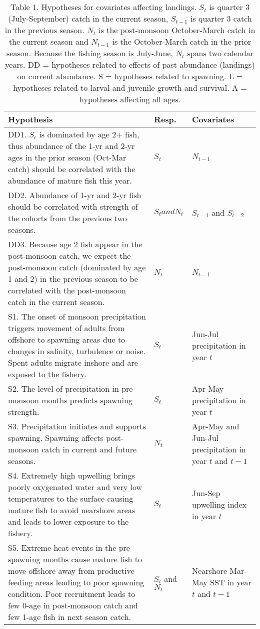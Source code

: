
\begin{table}[t]

\caption{\label{tab:print-table-hyp}Table 1. Hypotheses for covariates affecting landings.  $S_t$ is quarter 3 (July-September) catch in the current season, $S_{t-1}$ is quarter 3 catch in the previous season. $N_t$ is the post-monsoon October-March catch in the current season and $N_{t-1}$ is the October-March catch in the prior season. Because the fishing season is July-June, $N_t$ spans two calendar years. DD = hypotheses related to effects of past abundance (landings) on current abundance. S = hypotheses related to spawning. L = hypotheses related to larval and juvenile growth and survival. A = hypotheses affecting all ages.}
\centering
\begin{tabular}{>{\raggedright\arraybackslash}p{10.5cm}|>{\raggedright\arraybackslash}p{1cm}|>{\raggedright\arraybackslash}p{3cm}}
\hline
Hypothesis & Resp. & Covariates\\
\hline
DD1.  $S_t$ is dominated by age 2+ fish, thus abundance of the 1-yr and 2-yr ages in the prior season (Oct-Mar catch) should be correlated with the abundance of mature fish this year. & $S_t$ & $N_{t-1}$\\
\hline
DD2.  Abundance of 1-yr and 2-yr fish should be correlated with strength of the cohorts from the previous two seasons. & $S_t and N_t$ & $S_{t-1}$ and $S_{t-2}$\\
\hline
DD3.  Because age 2 fish appear in the post-monsoon catch, we expect the post-monsoon catch (dominated by age 1 and 2) in the previous season to be correlated with the post-monsoon catch in the current season. & $N_t$ & $N_{t-1}$\\
\hline
S1.  The onset of monsoon precipitation triggers movement of adults from offshore to spawning areas due to changes in salinity, turbulence or noise. Spent adults migrate inshore and are exposed to the fishery. & $S_t$ & Jun-Jul precipitation in year $t$\\
\hline
S2.  The level of precipitation in pre-monsoon months predicts spawning strength. & $S_t$ & Apr-May precipitation in year $t$\\
\hline
S3.  Precipitation initiates and supports spawning. Spawning affects post-monsoon catch in current and future seasons. & $N_t$ & Apr-May and Jun-Jul precipitation in year $t$ and $t-1$\\
\hline
S4.  Extremely high upwelling brings poorly oxygenated water and very low temperatures to the surface causing mature fish to avoid nearshore areas and leads to lower exposure to the fishery. & $S_t$ & Jun-Sep upwelling index in year $t$\\
\hline
S5.  Extreme heat events in the pre-spawning months cause mature fish to move offshore away from productive feeding areas leading to poor spawning condition. Poor recruitment leads to few 0-age in post-monsoon catch and few 1-age fish in next season catch. & $S_t$ and $N_t$ & Nearshore Mar-May SST in year $t$ and $t-1$\\
\hline
\end{tabular}
\end{table}

